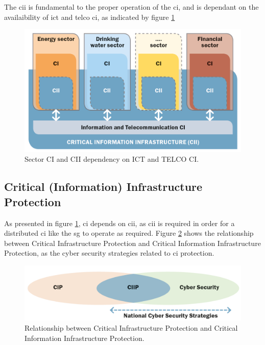The \acrshort{cii} is fundamental to the proper operation of the \acrshort{ci}, and is dependant on the availaibility of \acrfull{ict} and \acrfull{telco} \acrlong{ci}, as 
indicated by figure \ref{fig:CI-CIII}


\begin{figure}[ht]
\includegraphics[width=\linewidth]{figures/CI-CII.png}
\caption[CI/CIII in the ICT and TELCO sectors]{Sector CI and CII dependency on ICT and TELCO CI. \cite{luiijf2016gfce}}
\label{fig:CI-CIII}
\end{figure}


\subsection{Critical (Information) Infrastructure Protection}

As presented in figure \ref{fig:CI-CIII}, \acrfull{ci} depends on \acrfull{cii}, as \acrshort{cii} is required in order for a distributed \acrshort{ci} like the \acrshort{sg} to operate as required. Figure \ref{fig:CI-CIII-Security} shows the relationship between Critical Infrastructure Protection and Critical Information Infrastructure Protection, as the cyber security strategies related to \acrshort{ci} protection.


\begin{figure}[ht]
\includegraphics[width=\linewidth]{figures/CIP-CIIP-Security.png}
\caption[CIP-CIIP relations]{Relationship between Critical Infrastructure Protection and Critical Information Infrastructure Protection. \cite{luiijf2016gfce}}
\label{fig:CI-CIII-Security}
\end{figure}












